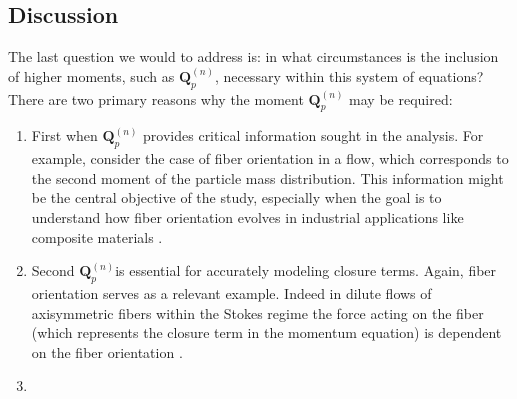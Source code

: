 \subsection{Discussion}
The last question we would to address is: in what circumstances is the inclusion of higher moments, such as $\textbf{Q}_p^{(n)}$, necessary within this system of equations?
There are two primary reasons why the moment $\textbf{Q}_p^{(n)}$ may be required:
\begin{enumerate}
\item First when $\textbf{Q}_p^{(n)}$ provides critical information sought in the analysis. 
For example, consider the case of fiber orientation in a flow, which corresponds to the second moment of the particle mass distribution. 
This information might be the central objective of the study, especially when the goal is to understand how fiber orientation evolves in industrial applications like composite materials \citep{advani1987use}.

\item Second $\textbf{Q}_p^{(n)}$is essential for accurately modeling closure terms. 
Again, fiber orientation serves as a relevant example. 
Indeed in dilute flows of axisymmetric fibers within the Stokes regime the force acting on the fiber (which represents the closure term in the momentum equation) is dependent on the fiber orientation \citep{kim2013microhydrodynamics}. %
\item {}
\end{enumerate}

